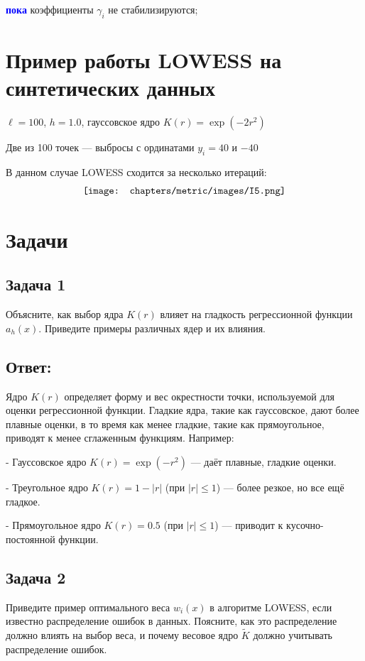 \textcolor{blue}{\textbf{пока}} коэффициенты \(\gamma_i\) не стабилизируются;

\section*{Пример работы LOWESS на синтетических данных}

\noindent
\(\ell = 100\), \(h = 1.0\), гауссовское ядро \(K(r) = \exp(-2r^2)\)

\vspace{1em}

Две из 100 точек — выбросы с ординатами \(y_i = 40\) и \(-40\)

\vspace{1em}

В данном случае LOWESS сходится за несколько итераций:
\begin{align*}
    \centering
    \texttt{[image: chapters/metric/images/I5.png]}
    \label{fig:kernel_triangle}
\end{align*}

\section{Задачи}
\subsection{Задача 1}
Объясните, как выбор ядра \(K(r)\) влияет на гладкость регрессионной функции \(a_h(x)\). Приведите примеры различных ядер и их влияния.
\subsection{Ответ:}
Ядро \(K(r)\) определяет форму и вес окрестности точки, используемой для оценки регрессионной функции. Гладкие ядра, такие как гауссовское, дают более плавные оценки, в то время как менее гладкие, такие как прямоугольное, приводят к менее сглаженным функциям. Например:

- Гауссовское ядро \(K(r) = \exp(-r^2)\) — даёт плавные, гладкие оценки.

- Треугольное ядро \(K(r) = 1 - \lvert r \rvert\) (при \(\lvert r \rvert \leq 1\)) — более резкое, но все ещё гладкое.

- Прямоугольное ядро \(K(r) = 0.5\) (при \(\lvert r \rvert \leq 1\)) — приводит к кусочно-постоянной функции.

\subsection{Задача 2}
Приведите пример оптимального веса \(w_i(x)\) в алгоритме LOWESS, если известно распределение ошибок в данных. Поясните, как это распределение должно влиять на выбор веса, и почему весовое ядро \(\tilde{K}\) должно учитывать распределение ошибок.

